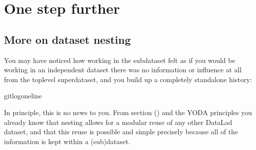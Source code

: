 \chapter{One step further}
\label{\detokenize{basics/basics-containers:one-step-further}}\label{\detokenize{basics/basics-containers:chapter-containersrun}}\label{\detokenize{basics/basics-containers::doc}}

\sphinxstepscope

\ignorespaces 

\section{More on dataset nesting}
\label{\detokenize{basics/101-132-advancednesting:more-on-dataset-nesting}}\label{\detokenize{basics/101-132-advancednesting:nesting2}}\label{\detokenize{basics/101-132-advancednesting:index-0}}\label{\detokenize{basics/101-132-advancednesting::doc}}
\sphinxAtStartPar
You may have noticed how working in the subdataset felt as if you would be
working in an independent dataset \textendash{} there was no information or influence at
all from the top\sphinxhyphen{}level  superdataset, and you build up a
completely stand\sphinxhyphen{}alone history:

\begin{sphinxVerbatim}[commandchars=\\\{\}]
gitlog\PYGZhy{}\PYGZhy{}oneline
\end{sphinxVerbatim}

\sphinxAtStartPar
In principle, this is no news to you. From section {\hyperref[\detokenize{basics/101-106-nesting:nesting}]{}} () and the
YODA principles you already know that nesting allows for a modular reuse of
any other DataLad dataset, and that this reuse is possible and simple
precisely because all of the information is kept within a (sub)dataset.

